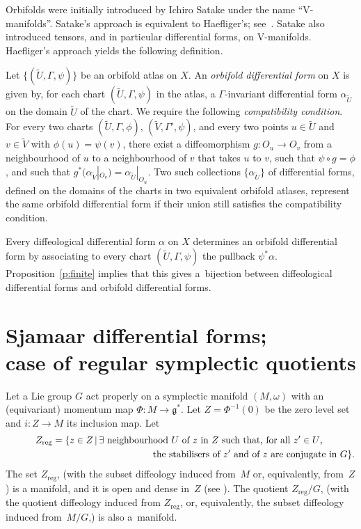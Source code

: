 \documentclass[pdftex]{sigma}
\numberwithin{equation}{section}
\newcommand{\g}{{\mathfrak{g}}} %
\def \reg {{\text{reg}}}
\def \tU {{\widetilde{U}}}
\newcommand{\hypref}[2]{{#2~\ref{#1}}}
\begin{document}
Orbifolds were initially introduced by Ichiro Satake \cite{satake56,satake57}
under the name ``V-manifolds''.
Satake's approach is equivalent to Haef\/liger's; see~\cite{IZKZ}.
Satake \cite{satake57} also introduced tensors,
and in particular dif\/ferential forms, on V-manifolds.
Haef\/liger's approach yields the following def\/inition.

Let $\{ (\tU, \Gamma, \psi) \} $ be an orbifold atlas on $X$.
An \emph{orbifold differential form} on $X$
is given by, for each chart $(\tU, \Gamma, \psi)$ in the atlas,
a $\Gamma$-invariant dif\/ferential form $\alpha_{\tU}$ on the domain $\tU$
of the chart. We require the following \emph{compatibility condition}.
For every two charts $(\tU,\Gamma,\phi)$, $(\tilde{V},\Gamma',\psi)$,
and every two points $u \in \tU$ and $v \in \tilde{V}$
with $\phi(u) = \psi(v)$,
there exist a dif\/feomorphism $g \colon O_u \to O_v$
from a neighbourhood of $u$ to a neighbourhood of $v$
that takes $u$ to $v$, such that $\psi \circ g = \phi$,
and such that $g^* (\alpha_{\tilde{V}}|_{O_v}) = \alpha_{\tU}|_{O_u}$.
Two such collections $\{ \alpha_{\tU} \}$ of dif\/ferential forms,
def\/ined on the domains of the charts in two equivalent orbifold atlases,
represent the same orbifold dif\/ferential form
if their union still satisf\/ies the compatibility condition.

Every dif\/feological dif\/ferential form $\alpha$ on $X$
determines an orbifold dif\/ferential form
by associating to every chart $(\tU, \Gamma, \psi)$
the pullback $\psi^* \alpha$.
\hypref{p:finite}{Proposition} implies that this gives a~bijection
between dif\/feological dif\/ferential forms and orbifold dif\/ferential forms.

\section[Sjamaar dif\/ferential forms; case of regular symplectic quotients]{Sjamaar dif\/ferential forms;\\ case of regular symplectic quotients}
\label{sec:sjamaar}

Let a Lie group $G$ act properly on a symplectic manifold $(M,\omega)$
with an (equivariant) momentum map $ \Phi \colon M \to \g^*$.
Let $Z = \Phi^{-1}(0)$ be the zero level set
and $i \colon Z \to M$ its inclusion map.
Let
\begin{gather*}
 Z_\reg = \{ z \in Z \, | \, \text{$\exists$ neighbourhood $U$
of $z$ in $Z$ such that, for all $z' \in U$, } \\
\hphantom{Z_\reg = \{ z \in Z \, |\, \text{$\exists$ neighbourhood $U$ }}{}
 \text{the stabilisers of $z'$ and of $z$ are conjugate in $G$} \}.
\end{gather*}
The set $Z_\reg$, (with the subset dif\/feology induced from~$M$
or, equivalently, from~$Z$) is a manifold,
and it is open and dense in~$Z$ (see \cite{SL}).
The quotient $Z_\reg/G$, (with the quotient dif\/feology induced from $Z_\reg$,
or, equivalently, the subset dif\/feology induced from~$M/G$,)
is also a~manifold.
\end{document}
